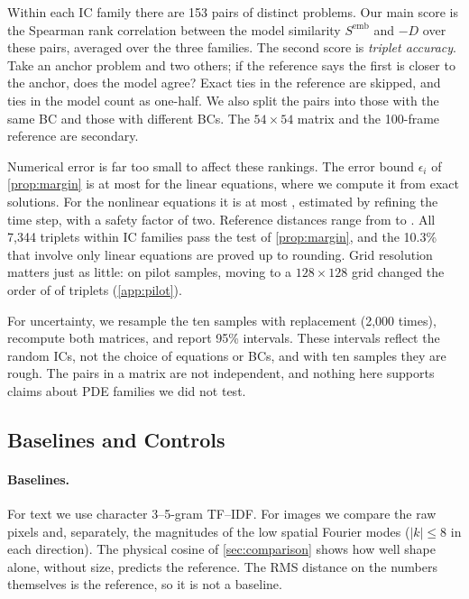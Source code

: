 Within each IC family there are 153 pairs of distinct problems. Our main score is the Spearman rank correlation between the model similarity $S^{\mathrm{emb}}$ and $-D$ over these pairs, averaged over the three families. The second score is \emph{triplet accuracy}. Take an anchor problem and two others; if the reference says the first is closer to the anchor, does the model agree? Exact ties in the reference are skipped, and ties in the model count as one-half. We also split the pairs into those with the same BC and those with different BCs. The $54\times54$ matrix and the 100-frame reference are secondary.

Numerical error is far too small to affect these rankings. The error bound $\epsilon_i$ of \cref{prop:margin} is at most  for the linear equations, where we compute it from exact solutions. For the nonlinear equations it is at most , estimated by refining the time step, with a safety factor of two. Reference distances range from  to . All 7,344 triplets within IC families pass the test of \cref{prop:margin}, and the 10.3\% that involve only linear equations are proved up to rounding. Grid resolution matters just as little: on pilot samples, moving to a $128\times128$ grid changed the order of \pilotFlips{} of \pilotTriplets{} triplets (\cref{app:pilot}).

For uncertainty, we resample the ten samples with replacement (2,000 times), recompute both matrices, and report 95\% intervals. These intervals reflect the random ICs, not the choice of equations or BCs, and with ten samples they are rough. The pairs in a matrix are not independent, and nothing here supports claims about PDE families we did not test.

\subsection{Baselines and Controls}
\paragraph{Baselines.}
For text we use character 3--5-gram TF--IDF. For images we compare the raw pixels and, separately, the magnitudes of the low spatial Fourier modes ($|k|\le8$ in each direction). The physical cosine of \cref{sec:comparison} shows how well shape alone, without size, predicts the reference. The RMS distance on the numbers themselves is the reference, so it is not a baseline.

